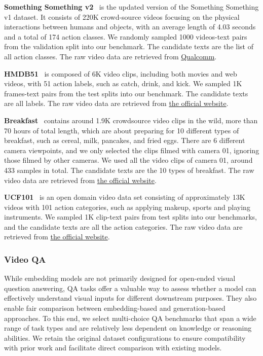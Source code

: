\textbf{Something Something v2}~\citep{ssv2} is the updated version of the Something Something v1 dataset. It consists of 220K crowd-source videos focusing on the physical interactions between humans and objects, with an average length of 4.03 seconds and a total of 174 action classes. We randomly sampled 1000 videos-text pairs from the validation split into our benchmark. The candidate texts are the list of all action classes. The raw video data are retrieved from \href{https://www.qualcomm.com/developer/software/something-something-v-2-dataset/downloads}{Qualcomm}. 

\textbf{HMDB51}~\citep{hmdb} is composed of 6K video clips, including both movies and web videos, with 51 action labels, such as catch, drink, and kick. We sampled 1K frames-text pairs from the test splits into our benchmark. The candidate texts are all labels. The raw video data are retrieved from \href{https://serre-lab.clps.brown.edu/resource/hmdb-a-large-human-motion-database/#overview}{the official website}. 

\textbf{Breakfast}~\citep{breakfast} contains around 1.9K crowdsource video clips in the wild, more than 70 hours of total length, which are about preparing for 10 different types of breakfast, such as cereal, milk, pancakes, and fried eggs. There are 6 different camera viewpoints, and we only selected the clips filmed with camera 01, ignoring those filmed by other cameras. We used all the video clips of camera 01, around 433 samples in total. The candidate texts are the 10 types of breakfast. The raw video data are retrieved from
\href{https://serre-lab.clps.brown.edu/resource/breakfast-actions-dataset/#Downloads}{the official website}. 

\textbf{UCF101}~\citep{ucf101} is an open domain video data set consisting of approximately 13K videos with 101 action categories, such as applying makeup, sports and playing instruments. We sampled 1K clip-text pairs from test splits into our benchmarks, and the candidate texts are all the action categories. The raw video data are retrieved from
\href{https://www.crcv.ucf.edu/data/UCF101.php#Results_on_UCF101}{the official website}. 


\subsubsection{Video QA}
While embedding models are not primarily designed for open-ended visual question answering, QA tasks offer a valuable way to assess whether a model can effectively understand visual inputs for different downstream purposes. They also enable fair comparison between embedding-based and generation-based approaches. To this end, we select multi-choice QA benchmarks that span a wide range of task types and are relatively less dependent on knowledge or reasoning abilities. We retain the original dataset configurations to ensure compatibility with prior work and facilitate direct comparison with existing models.

